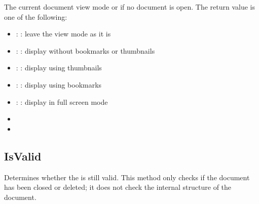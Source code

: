 \documentclass[letterpaper,12pt,english,openany,oneside]{sphinxmanual}
\begin{document}
The current document view mode or  if no document is open. The return value is one of the following:
\begin{itemize}
\item {} 
: : leave the view mode as it is

\item {} 
: : display without bookmarks or thumbnails

\item {} 
: : display using thumbnails

\item {} 
: : display using bookmarks

\item {} 
: : display in full screen mode

\end{itemize}
\label{\detokenize{IAC_API_OLE_Objects:related-methods-34}}
\begin{itemize}
\item {} 
 

\item {} 
 

\end{itemize}




\subsection{IsValid}
\label{\detokenize{IAC_API_OLE_Objects:isvalid}}
Determines whether the  is still valid. This method only checks if the document has been closed or deleted; it does not check the internal structure of the document.


\begin{sphinxVerbatim}[commandchars=\\\{\}]
 
\end{sphinxVerbatim}
\end{document}
